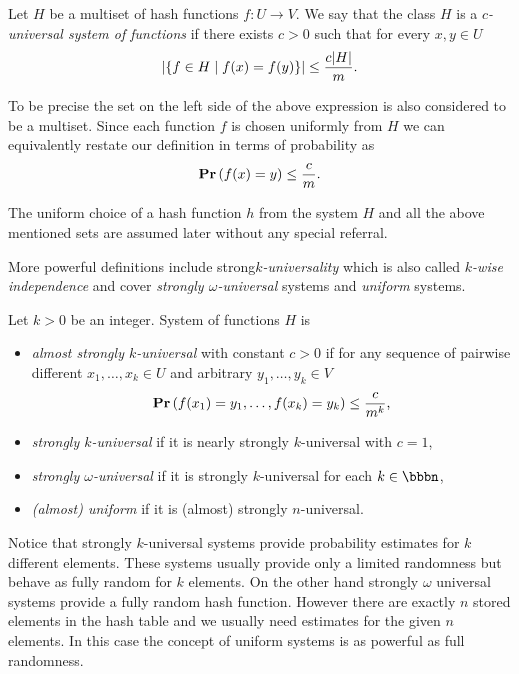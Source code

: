\begin{definition}
\label{definition-c-universal-system}
Let $H$ be a multiset of hash functions $f\colon U \rightarrow V$. We say that the class $H$ is a \emph{$c$-universal system of functions} if there exists $c > 0$ such that for every $x, y \in U$
\[
\left|\lbrace f \in H \mid f(x) = f(y) \rbrace\right| \leq \frac{c|H|}{m}.
\]
\end{definition}

To be precise the set on the left side of the above expression is also considered to be a multiset. Since each function $f$ is chosen uniformly from $H$ we can equivalently restate our definition in terms of probability as
\[
\mathbf{Pr}\left(f(x) = y\right) \leq \frac{c}{m}.
\]

The uniform choice of a hash function $h$ from the system $H$ and all the above mentioned sets are assumed later without any special referral.

More powerful definitions include strong\emph{$k$-universality} which is also called \emph{$k$-wise independence} and cover \emph{strongly $\omega$-universal} systems and \emph{uniform} systems.
\begin{definition}
Let $k > 0$ be an integer. System of functions $H$ is 
\begin{itemize}
	\item \emph{almost strongly $k$-universal} with constant $c > 0$ if for any sequence of pairwise different $x_1, \dots, x_k \in U$ and arbitrary $y_1, \dots, y_k \in V$ \[\mathbf{Pr}\left(f(x_1) = y_1, \dots, f(x_k) = y_k\right) \leq \frac{c}{m^k}\mbox{,}\]
	\item \emph{strongly $k$-universal} if it is nearly strongly $k$-universal with $c = 1$,
	\item \emph{strongly $\omega$-universal} if it is strongly $k$-universal for each $k \in \bbbn$,
	\item \emph{(almost) uniform} if it is (almost) strongly $n$-universal.
\end{itemize}
\end{definition}

Notice that strongly $k$-universal systems provide probability estimates for $k$ different elements. These systems usually provide only a limited randomness but behave as fully random for $k$ elements. On the other hand strongly $\omega$ universal systems provide a fully random hash function. However there are exactly $n$ stored elements in the hash table and we usually need estimates for the given $n$ elements. In this case the concept of uniform systems is as powerful as full randomness.
